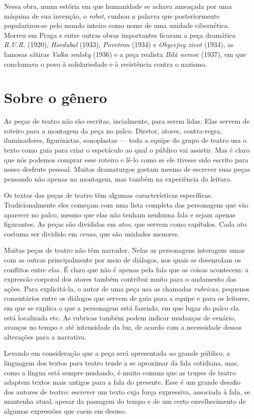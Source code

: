 Nessa obra, numa estória em que humanidade se achava ameaçada por uma
máquina de sua invenção, o \textit{robot}, cunhou a palavra que posteriormente
popularizou-se pelo mundo inteiro como nome de uma unidade cibernética.
Morreu em Praga e entre outras obras importantes ficaram a peça
dramática \textit{R.U.R.} (1920), \textit{Hordubal} (1933), \textit{Povetron} (1934) e
\textit{Obycejny zivot} (1934), as famosas sátiras \textit{Valka smloky} (1936) e a
peça realista \textit{Bilá nemoc} (1937), em que conclamava o povo à
solidariedade e à resistência contra o nazismo.

\section{Sobre o gênero}
As peças de teatro não são escritas, incialmente, para serem lidas. Elas servem de roteiro para a montagem da peça no palco. Diretor, atores, contra-regra, iluminadores, figurinistas, sonoplastas --- toda a equipe do grupo de teatro usa o texto como guia para criar o espetáculo ao qual o público vai assistir. Mas é claro que nós podemos comprar esse roteiro e lê-lo como se ele tivesse sido escrito para nosso desfrute pessoal. Muitos dramaturgos gostam mesmo de escrever suas peças pensando não apenas na montagem, mas também na experiência da leitura.  

Os textos das peças de teatro têm algumas características específicas. Tradicionalmente eles começam com uma lista completa das personagens que vão aparecer no palco, mesmo que elas não tenham nenhuma fala e sejam apenas figurantes. As peças são divididas em \textit{atos}, que servem como capítulos. Cada ato costuma ser dividido em \textit{cenas}, que são unidades menores. 

Muitas peças de teatro não têm narrador. Nelas as personagens interagem umas com as outras principalmente por meio de diálogos, nos quais se desenrolam os conflitos entre elas. É claro que não é apenas pela fala que as coisas acontecem: a expressão corporal dos atores também contribui muito para o andamento das ações. Para explicitá-la, o autor de uma peça usa as chamadas \textit{rubricas}, pequenos comentários entre os diálogos que servem de guia para a equipe e para os leitores, em que se explica o que a personagem está fazendo, em que lugar do palco ela está localizada etc. As rubricas também podem indicar mudanças de cenário, avanços no tempo e até intensidade da luz, de acordo com a necessidade dessas alterações para a narrativa.

Levando em consideração que a peça será apresentada ao grande público, a linguagem dos textos para teatro tende a se aproximar da fala cotidiana, mas, como a língua está sempre mudando, é muito comum que as trupes de teatro adaptem textos mais antigos para a fala do presente. Esse é um grande desafio dos autores de teatro: escrever um texto cuja força expressiva, associada à fala, se mantenha atual, apesar da passagem do tempo e de um certo envelhecimento de algumas expressões que caem em desuso.